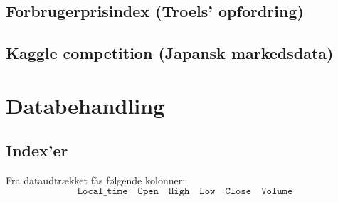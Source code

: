 \documentclass[a4paper,danish,12pt]{article}
\begin{document}
\subsection*{Forbrugerprisindex (Troels' opfordring)}


\subsection*{Kaggle competition (Japansk markedsdata)}


\section{Databehandling}

\subsection*{Index'er}
Fra dataudtrækket fås følgende kolonner:
\begin{equation*} 
\texttt{Local\_time}
\quad \texttt{Open}
\quad \texttt{High}
\quad \texttt{Low}
\quad \texttt{Close}
\quad \texttt{Volume}
\end{equation*}
\end{document}
